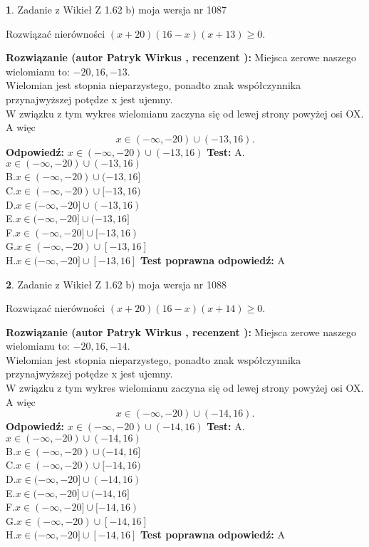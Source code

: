 \documentclass[12pt, a4paper]{article}
\theoremstyle{definition} %
\newtheorem{zad}{}
\newcommand{\zadStart}[1]{\begin{zad}#1\newline}
\newcommand{\zadStop}{\end{zad}}
\newcommand{\rozwStart}[2]{\noindent \textbf{Rozwiązanie (autor #1 , recenzent #2): }\newline}
\newcommand{\rozwStop}{\newline}
\newcommand{\odpStart}{\noindent \textbf{Odpowiedź:}\newline}
\newcommand{\odpStop}{\newline}
\newcommand{\testStart}{\noindent \textbf{Test:}\newline}
\newcommand{\testStop}{\newline}
\newcommand{\kluczStart}{\noindent \textbf{Test poprawna odpowiedź:}\newline}
\newcommand{\kluczStop}{\newline}
\begin{document}
\zadStart{Zadanie z Wikieł Z 1.62 b) moja wersja nr 1087}

Rozwiązać nierówności $(x+20)(16-x)(x+13)\ge0$.
\zadStop
\rozwStart{Patryk Wirkus}{}
Miejsca zerowe naszego wielomianu to: $-20, 16, -13$.\\
Wielomian jest stopnia nieparzystego, ponadto znak współczynnika przy\linebreak najwyższej potędze x jest ujemny.\\ W związku z tym wykres wielomianu zaczyna się od lewej strony powyżej osi OX. A więc $$x \in (-\infty,-20) \cup (-13,16).$$
\rozwStop
\odpStart
$x \in (-\infty,-20) \cup (-13,16)$
\odpStop
\testStart
A.$x \in (-\infty,-20) \cup (-13,16)$\\
B.$x \in (-\infty,-20) \cup (-13,16]$\\
C.$x \in (-\infty,-20) \cup [-13,16)$\\
D.$x \in (-\infty,-20] \cup (-13,16)$\\
E.$x \in (-\infty,-20] \cup (-13,16]$\\
F.$x \in (-\infty,-20] \cup [-13,16)$\\
G.$x \in (-\infty,-20) \cup [-13,16]$\\
H.$x \in (-\infty,-20] \cup [-13,16]$
\testStop
\kluczStart
A
\kluczStop



\zadStart{Zadanie z Wikieł Z 1.62 b) moja wersja nr 1088}

Rozwiązać nierówności $(x+20)(16-x)(x+14)\ge0$.
\zadStop
\rozwStart{Patryk Wirkus}{}
Miejsca zerowe naszego wielomianu to: $-20, 16, -14$.\\
Wielomian jest stopnia nieparzystego, ponadto znak współczynnika przy\linebreak najwyższej potędze x jest ujemny.\\ W związku z tym wykres wielomianu zaczyna się od lewej strony powyżej osi OX. A więc $$x \in (-\infty,-20) \cup (-14,16).$$
\rozwStop
\odpStart
$x \in (-\infty,-20) \cup (-14,16)$
\odpStop
\testStart
A.$x \in (-\infty,-20) \cup (-14,16)$\\
B.$x \in (-\infty,-20) \cup (-14,16]$\\
C.$x \in (-\infty,-20) \cup [-14,16)$\\
D.$x \in (-\infty,-20] \cup (-14,16)$\\
E.$x \in (-\infty,-20] \cup (-14,16]$\\
F.$x \in (-\infty,-20] \cup [-14,16)$\\
G.$x \in (-\infty,-20) \cup [-14,16]$\\
H.$x \in (-\infty,-20] \cup [-14,16]$
\testStop
\kluczStart
A
\kluczStop
\end{document}

